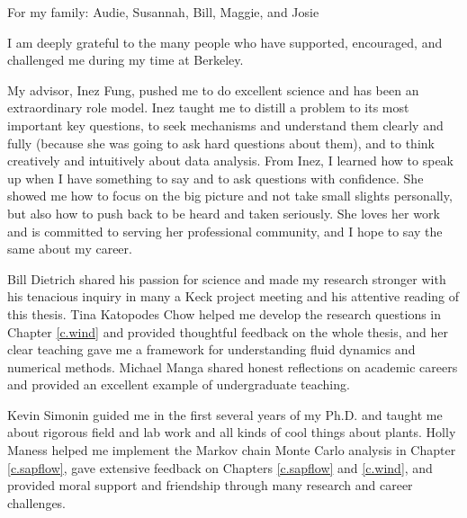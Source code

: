 \documentclass[12pt]{myucthesis}
\begin{document}
\hypersetup{pageanchor=true}
\begin{frontmatter}

\begin{dedication}
\null\vfil
{\large
\begin{center}
For my family: Audie, Susannah, Bill, Maggie, and Josie
\end{center}}
\null\vfil
\end{dedication}

\tableofcontents
\listoffigures %
\listoftables %


\begin{acknowledgements}

I am deeply grateful to the many people who have supported, encouraged, and challenged me during my time at Berkeley.

My advisor, Inez Fung, pushed me to do excellent science and has been an extraordinary role model.  Inez taught me to distill a problem to its most important key questions, to seek mechanisms and understand them clearly and fully (because she was going to ask hard questions about them), and to think creatively and intuitively about data analysis.  From Inez, I learned how to speak up when I have something to say and to ask questions with confidence.  She showed me how to focus on the big picture and not take small slights personally, but also how to push back to be heard and taken seriously.  She loves her work and is committed to serving her professional community, and I hope to say the same about my career.

Bill Dietrich shared his passion for science and made my research stronger with his tenacious inquiry in many a Keck project meeting and his attentive reading of this thesis.  Tina Katopodes Chow helped me develop the research questions in Chapter \ref{c.wind} and provided thoughtful feedback on the whole thesis, and her clear teaching gave me a framework for understanding fluid dynamics and numerical methods.  Michael Manga shared honest reflections on academic careers and provided an excellent example of undergraduate teaching.  

Kevin Simonin guided me in the first several years of my Ph.D. and taught me about rigorous field and lab work and all kinds of cool things about plants.  Holly Maness helped me implement the Markov chain Monte Carlo analysis in Chapter \ref{c.sapflow}, gave extensive feedback on Chapters \ref{c.sapflow} and \ref{c.wind}, and provided moral support and friendship through many research and career challenges.


\end{acknowledgements}
\end{frontmatter}
\end{document}
